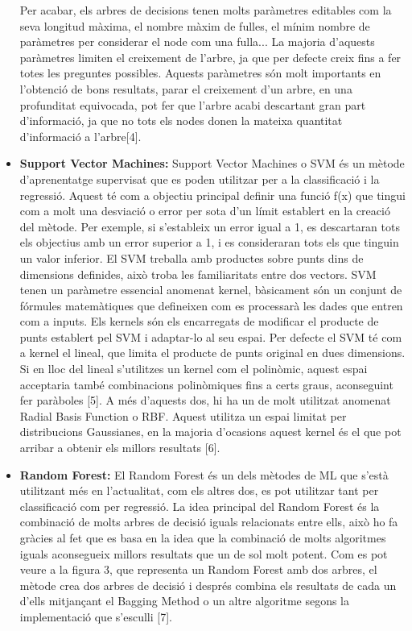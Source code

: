 \documentclass[10pt,a4paper,twocolumn,twoside]{article}
\begin{document}
\begin{itemize}
Per acabar, els arbres de decisions tenen molts paràmetres editables com la seva longitud màxima, el nombre màxim de fulles, el mínim nombre de paràmetres per considerar el node com una fulla... La majoria d'aquests paràmetres limiten el creixement de l'arbre, ja que per defecte creix fins a fer totes les preguntes possibles. Aquests paràmetres són molt importants en l'obtenció de bons resultats, parar el creixement d'un arbre, en una profunditat equivocada, pot fer que l'arbre acabi descartant gran part d'informació, ja que no tots els nodes donen la mateixa quantitat d'informació a l'arbre[4].
\item \textbf{Support Vector Machines:}
Support Vector Machines o SVM és un mètode d'aprenentatge supervisat que es poden utilitzar per a la classificació i la regressió. Aquest té com a objectiu principal definir una funció f(x) que tingui com a molt una desviació o error per sota d'un límit establert en la creació del mètode. Per exemple, si s'estableix un error igual a 1, es descartaran tots els objectius amb un error superior a 1, i es consideraran tots els que tinguin un valor inferior. El SVM treballa amb productes sobre punts dins de dimensions definides, això troba les familiaritats entre dos vectors. SVM tenen un paràmetre essencial anomenat kernel, bàsicament són un conjunt de fórmules matemàtiques que defineixen com es processarà les dades que entren com a inputs. Els kernels són els encarregats de modificar el producte de punts establert pel SVM i adaptar-lo al seu espai. Per defecte el SVM té com a kernel el lineal, que limita el producte de punts original en dues dimensions. Si en lloc del lineal s'utilitzes un kernel com el polinòmic, aquest espai acceptaria també combinacions polinòmiques fins a certs graus, aconseguint fer paràboles [5]. A més d'aquests dos, hi ha un de molt utilitzat anomenat Radial Basis Function o RBF. Aquest utilitza un espai limitat per distribucions Gaussianes, en la majoria d'ocasions aquest kernel és el que pot arribar a obtenir els millors resultats [6].
\item \textbf{Random Forest:}
El Random Forest és un dels mètodes de ML que s'està utilitzant més en l'actualitat, com els altres dos, es pot utilitzar tant per classificació com per regressió. La idea principal del Random Forest és la combinació de molts arbres de decisió iguals relacionats entre ells, això ho fa gràcies al fet que es basa en la idea que la combinació de molts algoritmes iguals aconsegueix millors resultats que un de sol molt potent. Com es pot veure a la figura 3, que representa un Random Forest amb dos arbres, el mètode crea dos arbres de decisió i després combina els resultats de cada un d'ells mitjançant el Bagging Method o un altre algoritme segons la implementació que s'esculli [7].


\end{itemize}
\end{document}
